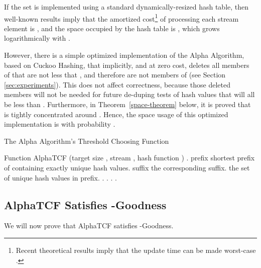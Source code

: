 \documentclass{article}
\begin{document}
If the set  is implemented using a standard dynamically-resized
hash table, then well-known results imply that the amortized cost\footnote{Recent
theoretical results imply that the update time can be made worst-case  \cite{deamortizedcuckoo1, deamortizedcuckoo2}.}
of processing each stream element is , and the space occupied by
the hash table is , which grows logarithmically with .

However, there is a simple optimized implementation of the Alpha
Algorithm, based on Cuckoo Hashing, that implicitly, and at zero cost,
deletes all members of  that are not less that , and therefore
are not members of  (see Section \ref{sec:experiments}). This does not affect correctness, because those 
deleted members will not be needed for future de-duping tests of hash
values that will all be less than . Furthermore, in Theorem~\ref{space-theorem} below, it
is proved that  is tightly concentrated around . Hence, the
space usage of this optimized implementation is  with probability .


\begin{algorithm}[t]
\caption{The Alpha Algorithm's Threshold Choosing Function}\label{code:alpha-tcf}
\begin{algorithmic}[1]{\footnotesize
\STATE Function AlphaTCF (target size , stream , hash function )
\STATE .
\STATE prefix shortest prefix of  containing exactly
        unique hash values.
\STATE suffix the corresponding suffix.
\STATE  the set of unique hash values in prefix.  \STATE .
\FORALL{}
\IF{}  \label{code:alpha-tcf-line-8}
\IF{}  \label{code:alpha-tcf-line-9}
\STATE . \label{code:alpha-tcf-line-10}
\STATE .
\ENDIF
\ENDIF
\ENDFOR
\RETURN . \label{code:alpha-tcf-line-15}
}\end{algorithmic}
\end{algorithm}



\subsection{AlphaTCF Satisfies -Goodness}\label{sec:alpha-sat}

We will now prove that AlphaTCF satisfies -Goodness.
\end{document}
